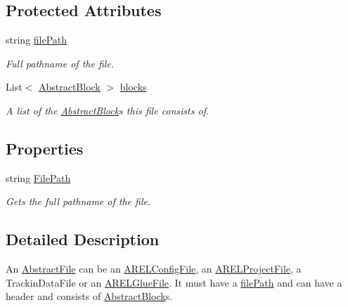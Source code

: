 \subsection*{Protected Attributes}
\begin{DoxyCompactItemize}
\item 
string \hyperlink{class_a_rdev_kit_1_1_model_1_1_project_1_1_file_1_1_abstract_file_ad879e3a81860da8b72f2d9f61a18ab3b}{file\-Path}
\begin{DoxyCompactList}\small\item\em Full pathname of the file. \end{DoxyCompactList}\item 
List$<$ \hyperlink{class_a_rdev_kit_1_1_model_1_1_project_1_1_file_1_1_abstract_block}{Abstract\-Block} $>$ \hyperlink{class_a_rdev_kit_1_1_model_1_1_project_1_1_file_1_1_abstract_file_a21e0333fb9d8eab8ebb039bd56ccabc9}{blocks}
\begin{DoxyCompactList}\small\item\em A list of the \hyperlink{class_a_rdev_kit_1_1_model_1_1_project_1_1_file_1_1_abstract_block}{Abstract\-Block}s this file consists of. \end{DoxyCompactList}\end{DoxyCompactItemize}
\subsection*{Properties}
\begin{DoxyCompactItemize}
\item 
string \hyperlink{class_a_rdev_kit_1_1_model_1_1_project_1_1_file_1_1_abstract_file_ac55b0e087f42f7ab5ce36fa3bce111ab}{File\-Path}
\begin{DoxyCompactList}\small\item\em Gets the full pathname of the file. \end{DoxyCompactList}\end{DoxyCompactItemize}


\subsection{Detailed Description}
An \hyperlink{class_a_rdev_kit_1_1_model_1_1_project_1_1_file_1_1_abstract_file}{Abstract\-File} can be an \hyperlink{class_a_rdev_kit_1_1_model_1_1_project_1_1_file_1_1_a_r_e_l_config_file}{A\-R\-E\-L\-Config\-File}, an \hyperlink{class_a_rdev_kit_1_1_model_1_1_project_1_1_file_1_1_a_r_e_l_project_file}{A\-R\-E\-L\-Project\-File}, a Trackin\-Data\-File or an \hyperlink{class_a_rdev_kit_1_1_model_1_1_project_1_1_file_1_1_a_r_e_l_glue_file}{A\-R\-E\-L\-Glue\-File}. It must have a \hyperlink{class_a_rdev_kit_1_1_model_1_1_project_1_1_file_1_1_abstract_file_ad879e3a81860da8b72f2d9f61a18ab3b}{file\-Path} and can have a header and consists of \hyperlink{class_a_rdev_kit_1_1_model_1_1_project_1_1_file_1_1_abstract_block}{Abstract\-Block}s. 

